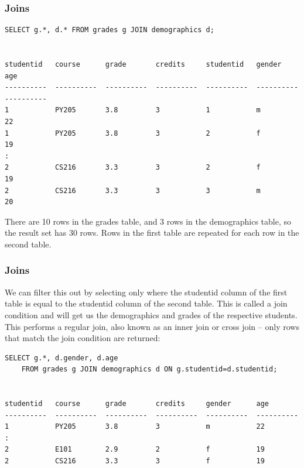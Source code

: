 \begin{frame}[fragile] \frametitle{Joins}
\begin{lstlisting}
SELECT g.*, d.* FROM grades g JOIN demographics d;


studentid   course      grade       credits     studentid   gender      age       
----------  ----------  ----------  ----------  ----------  ----------  ----------
1           PY205       3.8         3           1           m           22        
1           PY205       3.8         3           2           f           19        
:        
2           CS216       3.3         3           2           f           19        
2           CS216       3.3         3           3           m           20        
\end{lstlisting}
There are 10 rows in the grades table, and 3 rows in the demographics table, so the result set has 30 rows. Rows in the first table are repeated for each row in the second table.
\end{frame}

\begin{frame}[fragile] \frametitle{Joins}
We can filter this out by selecting only where the studentid column of the first table is equal to the studentid column of the second table. This is called a join condition and will get us the demographics and grades of the respective students. This performs a regular join, also known as an inner join or cross join -- only rows that match the join condition are returned:
\begin{lstlisting}
SELECT g.*, d.gender, d.age
    FROM grades g JOIN demographics d ON g.studentid=d.studentid;


studentid   course      grade       credits     gender      age
----------  ----------  ----------  ----------  ----------  ----------
1           PY205       3.8         3           m           22
:
2           E101        2.9         2           f           19
2           CS216       3.3         3           f           19
\end{lstlisting}
\end{frame}

